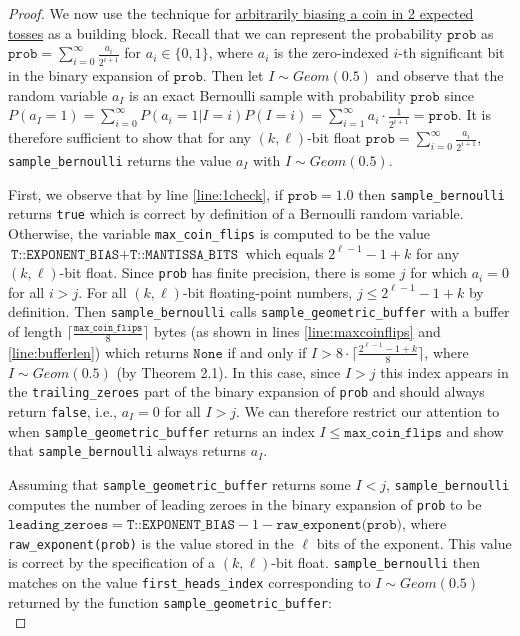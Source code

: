 \documentclass[11pt,a4paper]{article}
\theoremstyle{definition}
\begin{document}
\begin{proof}
We now use the technique for \href{https://web.archive.org/web/20160418185834/https://amakelov.wordpress.com/2013/10/10/arbitrarily-biasing-a-coin-in-2-expected-tosses/}{arbitrarily biasing a coin in 2 expected tosses} as a building block. Recall that we can represent the probability $\texttt{prob}$ as $\texttt{prob} = \sum_{i = 0}^\infty \frac{a_i}{2^{i + 1}}$ for $a_i \in \{0, 1\}$, where $a_i$ is the zero-indexed $i$-th significant bit in the binary expansion of $\texttt{prob}$. Then let $I \sim Geom(0.5)$ and observe that the random variable $a_I$ is an exact Bernoulli sample with probability $\texttt{prob}$ since $P(a_I = 1) = \sum_{i = 0}^\infty P(a_i = 1|I = i)P(I = i) = \sum_{i = 1}^\infty a_i \cdot \frac{1}{2^{i + 1}} = \texttt{prob}$. It is therefore sufficient to show that for any $(k,\ell)$-bit float $\texttt{prob} = \sum_{i = 0}^\infty \frac{a_i}{2^{i + 1}}$, \texttt{sample\_bernoulli} returns the value $a_I$ with $I \sim Geom(0.5)$.

First, we observe that by line \ref{line:1check}, if $\texttt{prob} = 1.0$ then \texttt{sample\_bernoulli} returns \texttt{true} which is correct by definition of a Bernoulli random variable. Otherwise, the variable \texttt{max\_coin\_flips} is computed to be the value $\texttt{T::EXPONENT\_BIAS} + \texttt{T::MANTISSA\_BITS}$ which equals $2^{\ell - 1} - 1 + k$ for any $(k,\ell)$-bit float. Since \texttt{prob} has finite precision, there is some $j$ for which $a_i = 0$ for all $i > j$. For all $(k,\ell)$-bit floating-point numbers, $j \le 2^{\ell - 1} - 1 + k$ by definition. Then \texttt{sample\_bernoulli} calls \texttt{sample\_geometric\_buffer} with a buffer of length $\lceil \frac{\texttt{max\_coin\_flips}}{8}\rceil$ bytes (as shown in lines \ref{line:maxcoinflips} and \ref{line:bufferlen}) which returns  $\texttt{None}$ if and only if $I > {8\cdot \lceil \frac{2^{\ell - 1} -1 + k}{8}\rceil}$, where $I \sim Geom(0.5)$ (by Theorem 2.1). In this case, since $I > j$ this index appears in the \texttt{trailing\_zeroes} part of the binary expansion of \texttt{prob} and should always return \texttt{false}, i.e., $a_I = 0$ for all $I > j$. We can therefore restrict our attention to when \texttt{sample\_geometric\_buffer} returns an index $I \le \texttt{max\_coin\_flips}$ and show that \texttt{sample\_bernoulli} always returns $a_I$. 

Assuming that \texttt{sample\_geometric\_buffer} returns some $I < j$,  \texttt{sample\_bernoulli} computes the number of leading zeroes in the binary expansion of \texttt{prob} to be $\texttt{leading\_zeroes} = \texttt{T::EXPONENT\_BIAS} - 1 - \texttt{raw\_exponent(prob)}$, where \texttt{raw\_exponent(prob)} is the value stored in the $\ell$ bits of the exponent. This value is correct by the specification of a $(k,\ell)$-bit float.  \texttt{sample\_bernoulli} then matches on the value \texttt{first\_heads\_index} corresponding to $I \sim Geom(0.5)$ returned by the function \texttt{sample\_geometric\_buffer}: \\


\end{proof}
\end{document}
